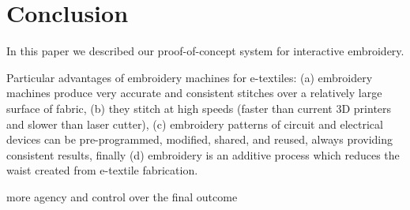 \documentclass[header.tex]{subfiles}
\begin{document}






\section{Conclusion}
In this paper we described our proof-of-concept system for interactive embroidery. 

Particular advantages of embroidery machines for e-textiles: (a) embroidery machines produce very accurate and consistent stitches over a relatively large surface of fabric, (b) they stitch at high speeds (faster than current 3D printers and slower than laser cutter), (c) embroidery patterns of circuit and electrical devices can be pre-programmed, modified, shared, and reused, always providing consistent results, finally (d) embroidery is an additive process which reduces the waist created from e-textile fabrication.


more agency and control over the final outcome \cite{}
\balance{}



\end{document}
